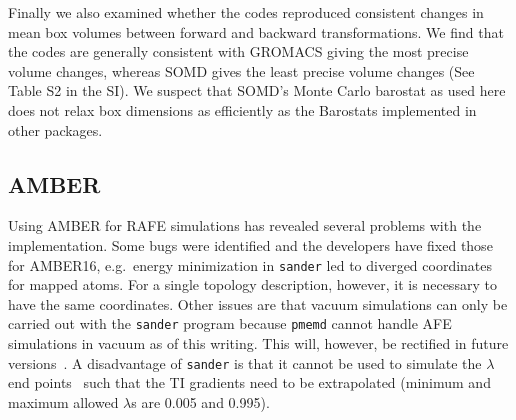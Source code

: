 \documentclass[journal=jctcce,manuscript=article]{achemso}
\newcommand{\progname}[1]{\texttt{#1}}
\begin{document}
\begin{table}[]
  \begin{minipage}{\linewidth}
    \caption{Cycle closure errors (in \si{kcal.mol^{-1}}) for  ethane$ \rightarrow$ methanol $\rightarrow$ methane
$\rightarrow$ ethane}\label{tab:cycle-closure}
  \end{minipage}
\end{table}

Finally we also examined whether the codes reproduced consistent changes in mean box volumes between forward and backward transformations. We find that the codes are generally consistent with GROMACS giving the most precise volume changes, whereas SOMD gives the least precise volume changes (See Table S2 in the SI). We suspect that SOMD's Monte Carlo barostat as used here does not relax box dimensions as efficiently as the Barostats implemented in other packages.

\subsection{AMBER}
\label{sec:amber-results}

Using AMBER for RAFE simulations has revealed several problems with the implementation.  Some bugs were identified and the developers have fixed those for AMBER16, e.g.\ energy minimization in \progname{sander} led to
diverged coordinates for mapped atoms.  For a single topology description,
however, it is necessary to have the same coordinates.  Other issues are that
vacuum simulations can only be carried out with the \progname{sander} program
because \progname{pmemd} cannot handle AFE simulations in vacuum as of this writing.  This will, however, be rectified in future
versions~\cite{doi:10.1021/acs.jctc.7b00102}.  A disadvantage of
\progname{sander} is that it cannot be used to simulate the $\lambda$ end
points~\cite{doi:10.1021/ct400340s} such that the TI gradients need to be
extrapolated (minimum and maximum allowed $\lambda$s are 0.005 and 0.995).
\end{document}
